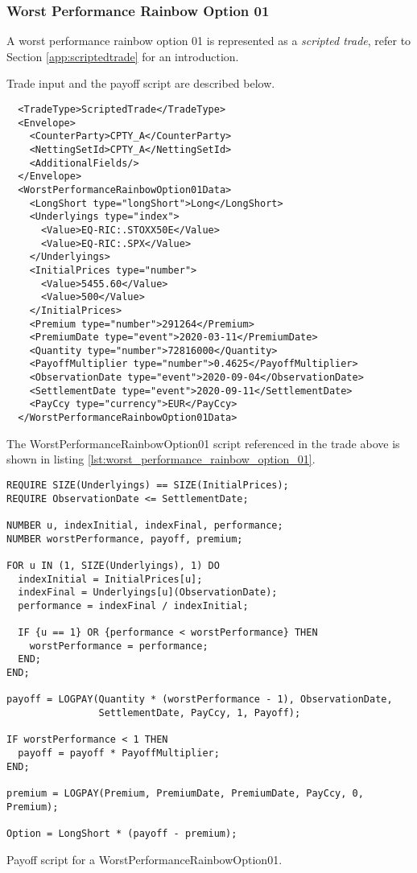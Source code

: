 \subsubsection*{Worst Performance Rainbow Option 01}

A worst performance rainbow option 01 is represented as a {\em scripted trade}, refer to
Section \ref{app:scriptedtrade} for an introduction.

Trade input and the payoff script are described below.

\begin{verbatim}
  <TradeType>ScriptedTrade</TradeType>
  <Envelope>
    <CounterParty>CPTY_A</CounterParty>
    <NettingSetId>CPTY_A</NettingSetId>
    <AdditionalFields/>
  </Envelope>
  <WorstPerformanceRainbowOption01Data>
    <LongShort type="longShort">Long</LongShort>
    <Underlyings type="index">
      <Value>EQ-RIC:.STOXX50E</Value>
      <Value>EQ-RIC:.SPX</Value>
    </Underlyings>
    <InitialPrices type="number">
      <Value>5455.60</Value>
      <Value>500</Value>
    </InitialPrices>
    <Premium type="number">291264</Premium>
    <PremiumDate type="event">2020-03-11</PremiumDate>
    <Quantity type="number">72816000</Quantity>
    <PayoffMultiplier type="number">0.4625</PayoffMultiplier>
    <ObservationDate type="event">2020-09-04</ObservationDate>
    <SettlementDate type="event">2020-09-11</SettlementDate>
    <PayCcy type="currency">EUR</PayCcy>
  </WorstPerformanceRainbowOption01Data>
\end{verbatim}

The WorstPerformanceRainbowOption01 script referenced in the trade above is shown in listing
\ref{lst:worst_performance_rainbow_option_01}.

\begin{listing}[hbt]
\begin{verbatim}
REQUIRE SIZE(Underlyings) == SIZE(InitialPrices);
REQUIRE ObservationDate <= SettlementDate;

NUMBER u, indexInitial, indexFinal, performance;
NUMBER worstPerformance, payoff, premium;

FOR u IN (1, SIZE(Underlyings), 1) DO
  indexInitial = InitialPrices[u];
  indexFinal = Underlyings[u](ObservationDate);
  performance = indexFinal / indexInitial;

  IF {u == 1} OR {performance < worstPerformance} THEN
    worstPerformance = performance;
  END;
END;

payoff = LOGPAY(Quantity * (worstPerformance - 1), ObservationDate,
                SettlementDate, PayCcy, 1, Payoff);

IF worstPerformance < 1 THEN
  payoff = payoff * PayoffMultiplier;
END;

premium = LOGPAY(Premium, PremiumDate, PremiumDate, PayCcy, 0, Premium);

Option = LongShort * (payoff - premium);
\end{verbatim}
\caption{Payoff script for a WorstPerformanceRainbowOption01.}
\label{lst:worst_performance_rainbow_option_01}
\end{listing}

